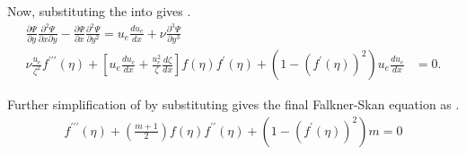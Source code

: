 \par Now, substituting the  into  gives .
\begin{align}
    \frac{\partial \Psi}{\partial y} \frac{\partial^2 \Psi}{\partial x \partial y} - \frac{\partial \Psi }{\partial x}\frac{\partial^2 \Psi}{\partial y^2} = u_e \frac{d u_e}{dx} + \nu \frac{\partial^3 \Psi}{\partial y^3} \nonumber \\
    \nu\frac{u_e}{\zeta^2} f^{\prime\prime\prime}(\eta) + \left[u_e \frac{d u_e}{dx} + \frac{u_e^2}{\zeta}\frac{d\zeta}{dx} \right] f(\eta) f^\prime(\eta) + \left( 1- \left(f^\prime(\eta)\right)^2\right) u_e \frac{d u_e}{dx} &= 0 \label{second_last_FS_equation}.
\end{align}

\par Further simplification of  by substituting  gives the final Falkner-Skan equation as .
\begin{align}
    \boxed{f^{\prime\prime\prime}(\eta) + \left(\frac{m+1}{2}\right)f(\eta) f^{\prime\prime}(\eta) + \left(1 - \left(f^{\prime}(\eta)\right)^2\right) m = 0} \label{FS_equation_final}
\end{align}

\pagebreak
